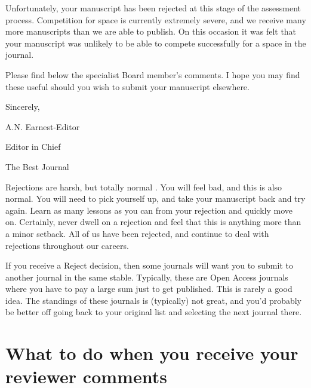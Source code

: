 \documentclass[
]{krantz}
\renewenvironment{quote}{\begin{VF}}{\end{VF}}
\begin{document}
\begin{quote}
Unfortunately, your manuscript has been rejected at this stage of the assessment process. Competition for space is currently extremely severe, and we receive many more manuscripts than we are able to publish. On this occasion it was felt that your manuscript was unlikely to be able to compete successfully for a space in the journal.
\end{quote}

\begin{quote}
Please find below the specialist Board member's comments. I hope you may find these useful should you wish to submit your manuscript elsewhere.
\end{quote}

\begin{quote}
Sincerely,
\end{quote}

\begin{quote}
A.N. Earnest-Editor
\end{quote}

\begin{quote}
Editor in Chief
\end{quote}

\begin{quote}
The Best Journal
\end{quote}

Rejections are harsh, but totally normal \citep{day2011silent}. You will feel bad, and this is also normal. You will need to pick yourself up, and take your manuscript back and try again. Learn as many lessons as you can from your rejection and quickly move on. Certainly, never dwell on a rejection and feel that this is anything more than a minor setback. All of us have been rejected, and continue to deal with rejections throughout our careers.

If you receive a Reject decision, then some journals will want you to submit to another journal in the same stable. Typically, these are Open Access journals where you have to pay a large sum just to get published. This is rarely a good idea. The standings of these journals is (typically) not great, and you'd probably be better off going back to your original list and selecting the next journal there.

\hypertarget{what-to-do-when-you-receive-your-reviewer-comments}{%
\section{What to do when you receive your reviewer comments}\label{what-to-do-when-you-receive-your-reviewer-comments}}
\end{document}
